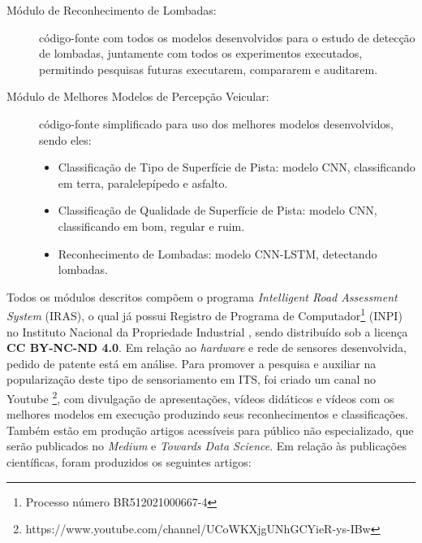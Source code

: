 \begin{small}
\begin{description}
    \item[Módulo de Reconhecimento de Lombadas:] código-fonte com todos os modelos desenvolvidos para o estudo de detecção de lombadas, juntamente com todos os experimentos executados, permitindo pesquisas futuras executarem, compararem e auditarem.
    
    \item[Módulo de Melhores Modelos de Percepção Veicular:] código-fonte simplificado para uso dos melhores modelos desenvolvidos, sendo eles:
    \begin{itemize}
        \item Classificação de Tipo de Superfície de Pista: modelo CNN, classificando em terra, paralelepípedo e asfalto.
        \item Classificação de Qualidade de Superfície de Pista: modelo CNN, classificando em bom, regular e ruim.
        \item Reconhecimento de Lombadas: modelo CNN-LSTM, detectando lombadas.
    \end{itemize}

\end{description}
\end{small}

Todos os módulos descritos compõem o programa \textit{Intelligent Road Assessment System} (IRAS), o qual já possui Registro de Programa de Computador\footnote{Processo número BR512021000667-4} (INPI) no Instituto Nacional da Propriedade Industrial , sendo distribuído sob a licença \textbf{CC BY-NC-ND 4.0}. Em relação ao \textit{hardware} e rede de sensores desenvolvida, pedido de patente está em análise. Para promover a pesquisa e auxiliar na popularização deste tipo de sensoriamento em ITS, foi criado um canal no Youtube \footnote{https://www.youtube.com/channel/UCoWKXjgUNhGCYieR-ys-IBw}, com divulgação de apresentações, vídeos didáticos e vídeos com os melhores modelos em execução produzindo seus reconhecimentos e classificações. Também estão em produção artigos acessíveis para público não especializado, que serão publicados no \textit{Medium} e \textit{Towards Data Science}. Em relação às publicações científicas, foram produzidos os seguintes artigos: 


